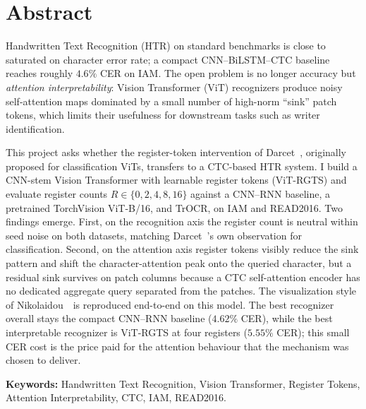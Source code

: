 \section*{Abstract}

Handwritten Text Recognition (HTR) on standard benchmarks is close to saturated on character error rate; a compact CNN--BiLSTM--CTC baseline reaches roughly $4.6\%$ CER on IAM. The open problem is no longer accuracy but \emph{attention interpretability}: Vision Transformer (ViT) recognizers produce noisy self-attention maps dominated by a small number of high-norm ``sink'' patch tokens, which limits their usefulness for downstream tasks such as writer identification.

This project asks whether the register-token intervention of Darcet~\etal, originally proposed for classification ViTs, transfers to a CTC-based HTR system. I build a CNN-stem Vision Transformer with learnable register tokens (ViT-RGTS) and evaluate register counts $R \in \{0, 2, 4, 8, 16\}$ against a CNN--RNN baseline, a pretrained TorchVision ViT-B/16, and TrOCR, on IAM and READ2016. Two findings emerge. First, on the recognition axis the register count is neutral within seed noise on both datasets, matching Darcet~\etal's own observation for classification. Second, on the attention axis register tokens visibly reduce the sink pattern and shift the character-attention peak onto the queried character, but a residual sink survives on patch columns because a CTC self-attention encoder has no dedicated aggregate query separated from the patches. The visualization style of Nikolaidou~\etal\ is reproduced end-to-end on this model. The best recognizer overall stays the compact CNN--RNN baseline ($4.62\%$ CER), while the best interpretable recognizer is ViT-RGTS at four registers ($5.55\%$ CER); this small CER cost is the price paid for the attention behaviour that the mechanism was chosen to deliver.

\vspace{0.4em}
\noindent\textbf{Keywords:} Handwritten Text Recognition, Vision Transformer, Register Tokens, Attention Interpretability, CTC, IAM, READ2016.
